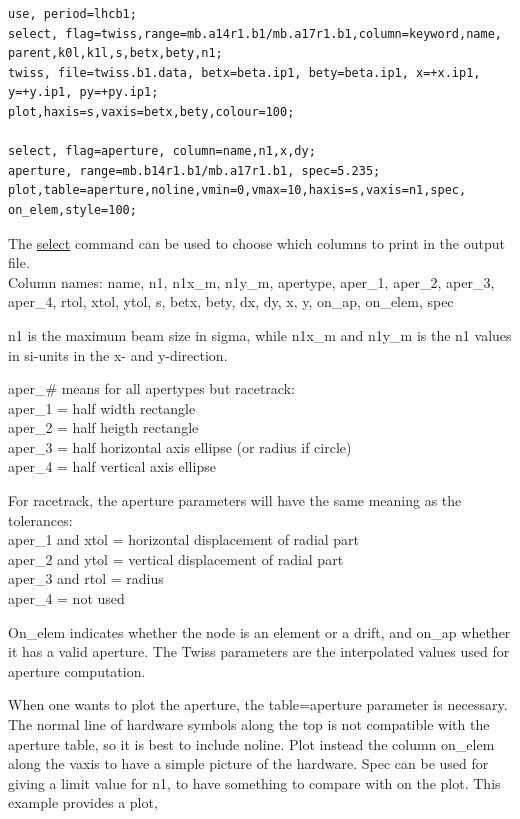 \begin{itemize}
\begin{verbatim}
use, period=lhcb1;
select, flag=twiss,range=mb.a14r1.b1/mb.a17r1.b1,column=keyword,name,
parent,k0l,k1l,s,betx,bety,n1;
twiss, file=twiss.b1.data, betx=beta.ip1, bety=beta.ip1, x=+x.ip1, 
y=+y.ip1, py=+py.ip1;
plot,haxis=s,vaxis=betx,bety,colour=100;

select, flag=aperture, column=name,n1,x,dy;
aperture, range=mb.b14r1.b1/mb.a17r1.b1, spec=5.235;
plot,table=aperture,noline,vmin=0,vmax=10,haxis=s,vaxis=n1,spec,
on_elem,style=100;
\end{verbatim}

 The \href{../Introduction/select.html}{select} command can be  used to choose which columns to print in the output file.  
\\ Column names: name, n1, n1x\_m, n1y\_m, apertype, aper\_1, aper\_2, aper\_3, aper\_4, rtol, xtol, ytol, s, betx, bety, dx, dy, x, y, on\_ap, on\_elem, spec 

 n1 is the maximum beam size in sigma, while n1x\_m and n1y\_m is the n1 values in si-units in the x- and y-direction. 

 aper\_\# means for all apertypes but racetrack:
\\ aper\_1 = half width rectangle
\\ aper\_2 = half heigth rectangle
\\ aper\_3 = half horizontal axis ellipse (or radius if circle)
\\ aper\_4 = half vertical axis ellipse

 For racetrack, the aperture parameters will have the same meaning as the tolerances:
\\ aper\_1 and xtol = horizontal displacement of radial part 
\\ aper\_2 and ytol = vertical displacement of radial part 
\\ aper\_3 and rtol = radius 
\\ aper\_4 = not used 

 On\_elem indicates whether the node is an element or a drift, and on\_ap  whether it has a valid aperture. The Twiss parameters are the interpolated  values used for aperture computation. 

 When one wants to plot the aperture, the table=aperture parameter is  necessary. The normal line of hardware symbols along the top is not  compatible with the aperture table, so it is best to include  noline. Plot instead the column on\_elem along the vaxis to have a  simple picture of the hardware. Spec can be used for giving a limit  value for n1, to have something to compare with on the plot. This example  provides a plot, 


\end{itemize}

